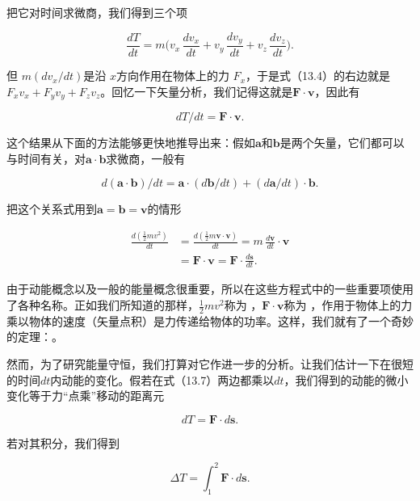 \documentclass[12pt,oneside]{book}
\providecommand{\ddt}[2]{\frac{d#1}{d#2}}
\providecommand{\FLPvec}[1]{\boldsymbol{#1}}
\providecommand{\FLPF}[0]{\FLPvec{F}}
\providecommand{\FLPa}[0]{\FLPvec{a}}
\providecommand{\FLPb}[0]{\FLPvec{b}}
\providecommand{\FLPs}[0]{\FLPvec{s}}
\providecommand{\FLPv}[0]{\FLPvec{v}}
\begin{document}
把它对时间求微商，我们得到三个项


\begin{equation}
\label{Eq:I:13:4}
\ddt{T}{t}=m\biggl(
v_x\,\ddt{v_x}{t}+
v_y\,\ddt{v_y}{t}+
v_z\,\ddt{v_z}{t}
\biggr).
\end{equation}

但 $ m(dv_x/dt) $是沿 $ x $方向作用在物体上的力 $ F_x $，于是式（13.4）的右边就是 $ F_xv_x + F_yv_y + F_zv_z $。回忆一下矢量分析，我们记得这就是$\FLPF\cdot\FLPv$，因此有


\begin{equation}
\label{Eq:I:13:5}
dT/dt=\FLPF\cdot\FLPv.
\end{equation}

这个结果从下面的方法能够更快地推导出来：假如$\FLPa$和$\FLPb$是两个矢量，它们都可以与时间有关，对$\FLPa\cdot\FLPb$求微商，一般有


\begin{equation}
\label{Eq:I:13:6}
d(\FLPa\cdot\FLPb)/dt=\FLPa\cdot(d\FLPb/dt)+(d\FLPa/dt)\cdot\FLPb.
\end{equation}

把这个关系式用到$\FLPa = \FLPb = \FLPv$的情形

\begin{equation}
\begin{aligned}
\ddt{(\tfrac{1}{2}mv^2)}{t}&=\ddt{(\tfrac{1}{2}m\FLPv\cdot\FLPv)}{t}
=m\,\ddt{\FLPv}{t}\cdot\FLPv\\[1.5ex]
&=\FLPF\cdot\FLPv=\FLPF\cdot\ddt{\FLPs}{t}.
\end{aligned}
\label{Eq:I:13:7}
\end{equation}

由于动能概念以及一般的能量概念很重要，所以在这些方程式中的一些重要项使用了各种名称。正如我们所知道的那样，$\frac{1}{2}mv^{2}$称为 ，$\FLPF\cdot\FLPv$称为 ，作用于物体上的力乘以物体的速度（矢量点积）是力传递给物体的功率。这样，我们就有了一个奇妙的定理：。


然而，为了研究能量守恒，我们打算对它作进一步的分析。让我们估计一下在很短的时间$dt$内动能的变化。假若在式（13.7）两边都乘以$dt$，我们得到的动能的微小变化等于力“点乘”移动的距离元

\begin{equation}
\label{Eq:I:13:8}
dT=\FLPF\cdot d\FLPs.
\end{equation}

若对其积分，我们得到


\begin{equation}
\label{Eq:I:13:9}
\Delta T=\int_1^2\FLPF\cdot d\FLPs.
\end{equation}
\end{document}
